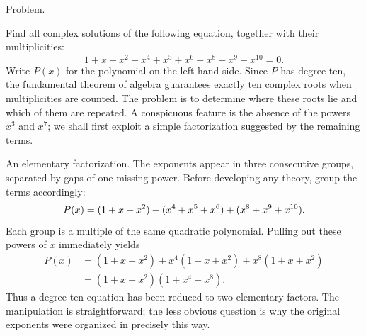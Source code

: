 \documentclass[11pt,aspectratio=169]{beamer}
\newcommand{\slidebody}{%
  \fontsize{10.6}{12.8}\selectfont\justifying%
  \setlength{\parskip}{4.2pt}%
  \setlength{\abovedisplayskip}{4pt}%
  \setlength{\belowdisplayskip}{4pt}%
  \setlength{\abovedisplayshortskip}{2pt}%
  \setlength{\belowdisplayshortskip}{2.5pt}%
}
\newcommand{\tightbody}{\slidebody\fontsize{10.2}{12.3}\selectfont\setlength{\parskip}{3pt}}
\newcommand{\smallequation}{\fontsize{10.5}{13}\selectfont}
\begin{document}
\begin{frame}[t]{Problem.}
\slidebody
Find all complex solutions of the following equation, together with their multiplicities:
\begin{equation}\label{eq:problem}
  1+x+x^2+x^4+x^5+x^6+x^8+x^9+x^{10}=0.
\end{equation}
Write $P(x)$ for the polynomial on the left-hand side. Since $P$ has degree ten, the fundamental theorem of algebra guarantees exactly ten complex roots when multiplicities are counted. The problem is to determine where these roots lie and which of them are repeated. A conspicuous feature is the absence of the powers $x^3$ and $x^7$; we shall first exploit a simple factorization suggested by the remaining terms.
\end{frame}

\begin{frame}[t]{An elementary factorization.}
\tightbody
The exponents appear in three consecutive groups, separated by gaps of one missing power. Before developing any theory, group the terms accordingly:
\begin{equation}\label{eq:grouping}
\smallequation
  P(x)=(1+x+x^2)+(x^4+x^5+x^6)+(x^8+x^9+x^{10}).
\end{equation}
Each group is a multiple of the same quadratic polynomial. Pulling out these powers of $x$ immediately yields
\begin{equation}\label{eq:ansatz}
\begin{aligned}
 P(x)&=(1+x+x^2)+x^4(1+x+x^2)+x^8(1+x+x^2)\\
     &=(1+x+x^2)(1+x^4+x^8).
\end{aligned}
\end{equation}
Thus a degree-ten equation has been reduced to two elementary factors. The manipulation is straightforward; the less obvious question is why the original exponents were organized in precisely this way.
\end{frame}
\end{document}
